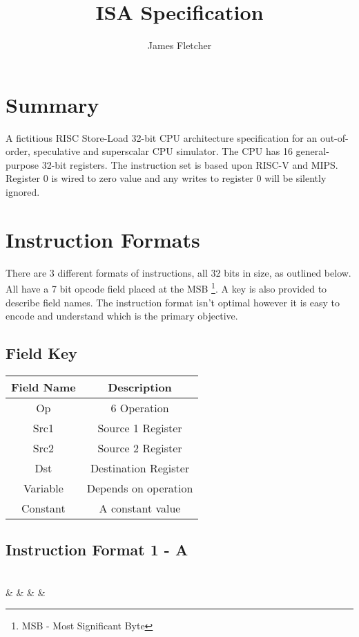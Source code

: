 \documentclass[]{article}
\title{ISA Specification}
\author{James Fletcher}
\begin{document}
\maketitle

\tableofcontents

\begin{abstract}

\end{abstract}

\section{Summary}
A fictitious RISC Store-Load 32-bit CPU architecture specification for an out-of-order, speculative and superscalar CPU simulator. The CPU has 16 general-purpose 32-bit registers. The instruction set is based upon RISC-V and MIPS. Register 0 is wired to zero value and any writes to register 0 will be silently ignored.

\section{Instruction Formats}
There are 3 different formats of instructions, all 32 bits in size, as outlined below. All have a 7 bit opcode field placed at the MSB \footnote{MSB - Most Significant Byte}. A key is also provided to describe field names. The instruction format isn't optimal however it is easy to encode and understand which is the primary objective. \vspace{2ex}

\subsection{Field Key}
\begin{tabular}{|c|c|} 
	\hline
	Field Name & Description \\
	\hline
	Op & 6 Operation \\ 
	\hline
	Src1 & Source 1 Register \\
	\hline
	Src2 & Source 2 Register \\
	\hline
	Dst & Destination Register \\
	\hline
	Variable & Depends on operation \\
	\hline
	Constant & A constant value \\
	\hline
\end{tabular}

\subsection{Instruction Format 1 - A}
\begin{bytefield}[endianness=big,bitwidth=.8em]{32}
	 \\
	 &  &  &  & 
\end{bytefield}
\end{document}
